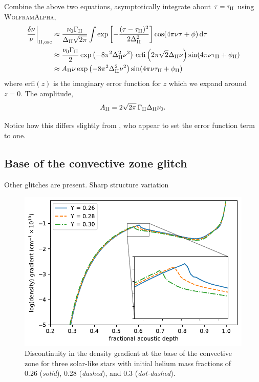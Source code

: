 Combine the above two equations, asymptotically integrate about \(\tau = \tau_{{\mathrm{II}}}\) using \textsc{WolframAlpha},
%
\begin{align}
    \left.\frac{\delta\nu}{\nu}\right|_{{\mathrm{II}}, \mathrm{osc}} &\approx \frac{\nu_0 \Gamma_{{\mathrm{II}}}}{\Delta_{{\mathrm{II}}} \sqrt{2\pi}} \int \exp\left[ - \frac{(\tau - \tau_{{\mathrm{II}}})^2}{2\Delta_{{\mathrm{II}}}^2} \right] \cos(4 \pi \nu \tau + \phi) \, \mathrm{d} \tau \\
    &\approx \frac{\nu_0 \Gamma_{{\mathrm{II}}}}{2} \exp\left(- 8 \pi^2 \Delta_{{\mathrm{II}}}^2 \nu^2\right) \, \mathrm{erfi}\left(2\pi\sqrt{2}\Delta_{{\mathrm{II}}}\nu\right) \sin(4 \pi \nu \tau_{{\mathrm{II}}} + \phi_{{\mathrm{II}}})\\
    &\approx A_{{\mathrm{II}}} \nu \exp\left(- 8 \pi^2 \Delta_{{\mathrm{II}}}^2 \nu^2\right) \sin(4 \pi \nu \tau_{{\mathrm{II}}} + \phi_{{\mathrm{II}}})
\end{align}
%
where \(\mathrm{erfi}(z)\) is the imaginary error function for \(z\) which we expand around \(z=0\). The amplitude,
%
\begin{equation}
    A_{{\mathrm{II}}} = 2 \sqrt{2\pi} \, \Gamma_{{\mathrm{II}}} \Delta_{{\mathrm{II}}} \nu_0.
\end{equation}

Notice how this differs slightly from \citet{Houdek.Gough2007}, who appear to set the error function term to one.

\subsection{Base of the convective zone glitch}\label{sec:bcz-glitch}

Other glitches are present. Sharp structure variation

\begin{figure}
    \centering
    \includegraphics{figures/bcz-density-gradient.pdf}
    \caption{Discontinuity in the density gradient at the base of the convective zone for three solar-like stars with initial helium mass fractions of 0.26 (\emph{solid}), 0.28 (\emph{dashed}), and 0.3 (\emph{dot-dashed}).}
    \label{fig:bcz-density}
\end{figure}

